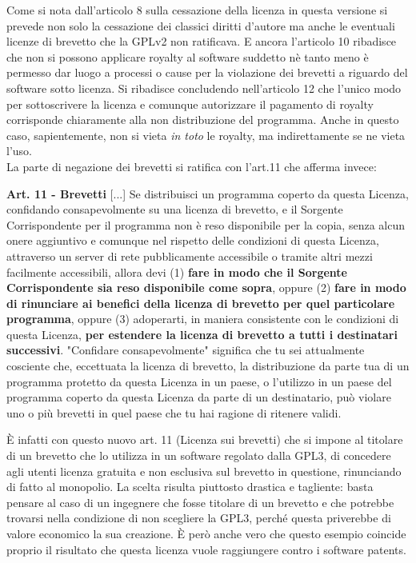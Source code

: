 Come si nota dall'articolo 8 sulla cessazione della licenza in questa versione si prevede non solo la cessazione dei classici diritti d'autore ma anche le eventuali licenze di brevetto che la GPLv2 non ratificava. E ancora l'articolo 10 ribadisce che non si possono applicare royalty al software suddetto nè tanto meno è permesso dar luogo a processi o cause per la violazione dei brevetti a riguardo del software sotto licenza. Si ribadisce concludendo nell'articolo 12 che l'unico modo per sottoscrivere la licenza e comunque autorizzare il pagamento di royalty corrisponde chiaramente alla non distribuzione del programma. Anche in questo caso, sapientemente, non si vieta \textit{in toto} le royalty, ma indirettamente se ne vieta l'uso.\\

La parte di negazione dei brevetti si ratifica con l'art.11 che afferma invece:\\

\begin{scriptsize}

\textbf{Art. 11 -  Brevetti}
[...]
Se distribuisci un programma coperto da questa Licenza, confidando consapevolmente su una licenza di brevetto, e il Sorgente Corrispondente per il programma non è reso disponibile per la copia, senza alcun onere aggiuntivo e comunque nel rispetto delle condizioni di questa Licenza, attraverso un server di rete pubblicamente accessibile o tramite altri mezzi facilmente accessibili, allora devi (1) \textbf{fare in modo che il Sorgente Corrispondente sia reso disponibile come sopra}, oppure (2) \textbf{fare in modo di rinunciare ai benefici della licenza di brevetto per quel particolare programma}, oppure (3) adoperarti, in maniera consistente con le condizioni di questa Licenza, \textbf{per estendere la licenza di brevetto a tutti i destinatari successivi}. "Confidare consapevolmente" significa che tu sei attualmente cosciente che, eccettuata la licenza di brevetto, la distribuzione da parte tua di un programma protetto da questa Licenza in un paese, o l'utilizzo in un paese del programma coperto da questa Licenza da parte di un destinatario, può violare uno o più brevetti in quel paese che tu hai ragione di ritenere validi.\\

\end{scriptsize}


\`E infatti con questo nuovo art. 11 (Licenza sui brevetti) che si impone al titolare di un brevetto che lo utilizza in un software regolato dalla GPL3, di concedere agli utenti licenza gratuita e non esclusiva sul brevetto in questione, rinunciando di fatto al monopolio. La scelta risulta piuttosto drastica e tagliente: basta pensare al caso di un ingegnere che fosse titolare di un brevetto e che potrebbe trovarsi nella condizione di non scegliere la GPL3, perché questa priverebbe di valore economico la sua creazione. \`E però anche vero che questo esempio coincide proprio il risultato che questa licenza vuole raggiungere contro i software patents.


